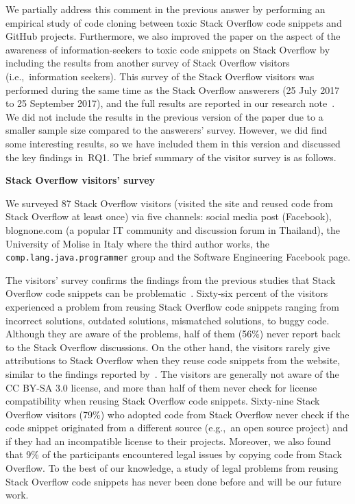 \documentclass[a4paper,twoside,10pt]{reviewresponse}
\begin{document}
We partially address this comment in the previous answer by performing an
empirical study of code cloning between toxic Stack Overflow code snippets and
GitHub projects. Furthermore, we also improved the paper on the aspect of the
awareness of information-seekers to toxic code snippets on Stack Overflow by
including the results from another survey of Stack Overflow visitors
(i.e.,~information seekers). This survey of the Stack Overflow visitors was
performed during the same time as the Stack Overflow answerers (25 July 2017 to
25 September 2017), and the full results are reported in our research note~\citep{Ragkhitwetsagul_RN2017}. 
We did not include the results in the
previous version of the paper due to a smaller sample size compared to the
answerers' survey. However, we did find some interesting results, so we have
included them in this version and discussed the key findings in~RQ1. The brief
summary of the visitor survey is as follows.

\textbf{Stack Overflow visitors' survey}

We surveyed 87 Stack Overflow visitors (visited the site and reused code from Stack
Overflow at least once) via five channels: social media post (Facebook),
\textsf{blognone.com} (a popular IT community and discussion forum in Thailand),
the University of Molise in Italy where the third author works, the
\texttt{comp.lang.java.programmer} group and the Software Engineering Facebook
page.

The visitors' survey confirms the findings from the previous studies that Stack
Overflow code snippets can be problematic~\citep{Zhang2018,Acar2016,An2017}. Sixty-six
percent of the visitors experienced a problem from reusing Stack Overflow code
snippets ranging from incorrect solutions, outdated solutions, mismatched
solutions, to buggy code. Although they are aware of the problems, half of them
(56\%) never report back to the Stack Overflow discussions. On the other hand,
the visitors rarely give attributions to Stack Overflow when they reuse code
snippets from the website, similar to the findings reported
by~\cite{Baltes2017}. The visitors are generally not aware of the CC BY-SA 3.0
license, and more than half of them never check for license compatibility when
reusing Stack Overflow code snippets. 
Sixty-nine Stack Overflow visitors (79\%) who adopted code from Stack Overflow never 
check if the code snippet originated from a different source (e.g.,~an open source project) 
and if they had an incompatible license to their projects.
Moreover, we also found that 9\% of the participants
encountered legal issues by copying code from Stack Overflow. To the best of our
knowledge, a study of legal problems from reusing Stack Overflow code snippets
has never been done before and will be our future work.
\end{document}
